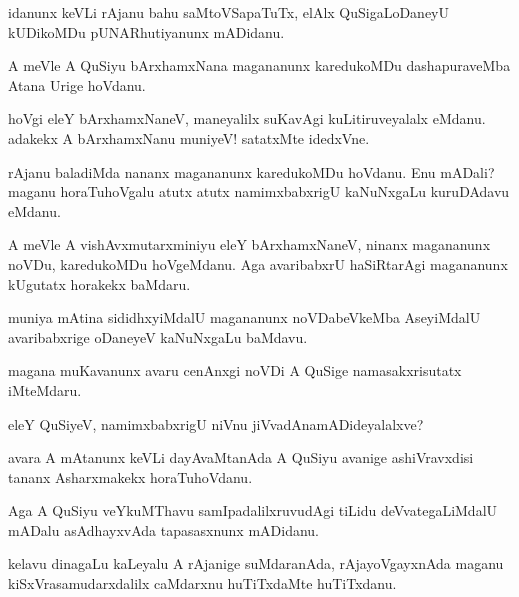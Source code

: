\begin{mng}
idanunx keVLi rAjanu bahu saMtoVSapaTuTx, elAlx QuSigaLoDaneyU kUDikoMDu pUNARhutiyanunx mADidanu.
\end{mng}

\begin{mng}
A meVle A QuSiyu bArxhamxNana magananunx karedukoMDu dashapuraveMba Atana Urige hoVdanu.
\end{mng}

\begin{mng}
hoVgi eleY bArxhamxNaneV, maneyalilx suKavAgi kuLitiruveyalalx eMdanu. adakekx A bArxhamxNanu muniyeV! satatxMte idedxVne.
\end{mng}

\begin{mng}
rAjanu baladiMda nananx magananunx karedukoMDu hoVdanu. Enu mADali? maganu horaTuhoVgalu atutx atutx namimxbabxrigU kaNuNxgaLu kuruDAdavu eMdanu.
\end{mng}

\begin{mng}
A meVle A vishAvxmutarxminiyu eleY bArxhamxNaneV, ninanx magananunx noVDu, karedukoMDu hoVgeMdanu. Aga avaribabxrU haSiRtarAgi magananunx kUgutatx horakekx baMdaru.
\end{mng}

\begin{mng}
muniya mAtina sididhxyiMdalU magananunx noVDabeVkeMba AseyiMdalU avaribabxrige oDaneyeV kaNuNxgaLu baMdavu.
\end{mng}

\begin{mng}
magana muKavanunx avaru cenAnxgi noVDi A QuSige namasakxrisutatx iMteMdaru.
\end{mng}

\begin{mng}
eleY QuSiyeV, namimxbabxrigU niVnu jiVvadAnamADideyalalxve?
\end{mng}

\begin{mng}
avara A mAtanunx keVLi dayAvaMtanAda A QuSiyu avanige ashiVravxdisi tananx Asharxmakekx horaTuhoVdanu.
\end{mng}

\begin{mng}
Aga A QuSiyu veYkuMThavu samIpadalilxruvudAgi tiLidu deVvategaLiMdalU mADalu asAdhayxvAda tapasasxnunx mADidanu.
\end{mng}

\begin{mng}
kelavu dinagaLu kaLeyalu A rAjanige suMdaranAda, rAjayoVgayxnAda maganu kiSxVrasamudarxdalilx caMdarxnu  huTiTxdaMte huTiTxdanu.
\end{mng}

